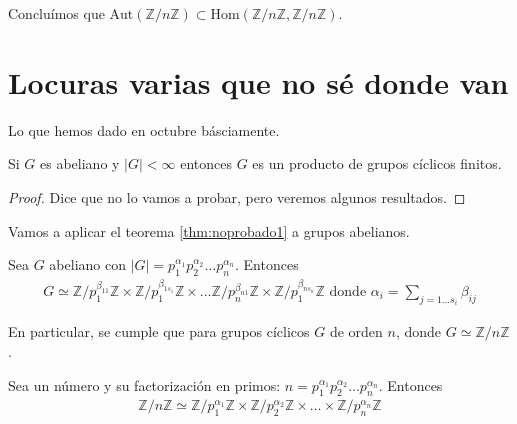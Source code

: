 \documentclass{book}
\theoremstyle{definition}
\theoremstyle{remark}
\newcommand{\isom}{\simeq}
\newcommand{\N}{\mathbb{N}}
\newcommand{\Z}{\mathbb{Z}}
\newcommand{\ZnZ}{\mathbb{Z}/n\mathbb{Z}}
\begin{document}
Concluímos que $\text{Aut}(\ZnZ) \subset \text{Hom}(\ZnZ, \ZnZ)$.



\chapter{Locuras varias que no sé donde van}

Lo que hemos dado en octubre básciamente.

\begin{thm}
	\label{thm:noprobado1}
	Si $G$ es abeliano y $|G| < \infty$ entonces $G$ es un producto de grupos cíclicos finitos.
\end{thm}

\begin{proof}
	Dice que no lo vamos a probar, pero veremos algunos resultados.
\end{proof}

%

Vamos a aplicar el teorema \ref{thm:noprobado1} a grupos abelianos.

\begin{thm}
	Sea $G$ abeliano con $|G| = p_1^{\alpha_1}p_2^{\alpha_2}\dots p_n^{\alpha_n}$. Entonces
	\begin{align}
		G \isom \Z/p_1^{\beta_{11}}\Z \times \Z/p_1^{\beta_{1s_1}}\Z \times \dots \Z/p_n^{\beta_{n1}}\Z \times \Z/p_1^{\beta_{ns_n}}\Z \text{ donde } \alpha_i = \sum_{j = 1\dots s_i} \beta_{ij}
	\end{align}
\end{thm}

En particular, se cumple que para grupos cíclicos $G$ de orden $n$, donde $G \isom \ZnZ$.

\begin{thm}
	\label{thm:znzisomproductodirecto}
	Sea un número y su factorización en primos: $n = p_1^{\alpha_1}p_2^{\alpha_2}\dots p_n^{\alpha_n}$. Entonces
	\begin{align}
	\ZnZ \isom \Z/p_1^{\alpha_1}\Z \times \Z/p_2^{\alpha_2}\Z \times \dots \times \Z/p_n^{\alpha_n}\Z
	\end{align}
\end{thm}
\end{document}
